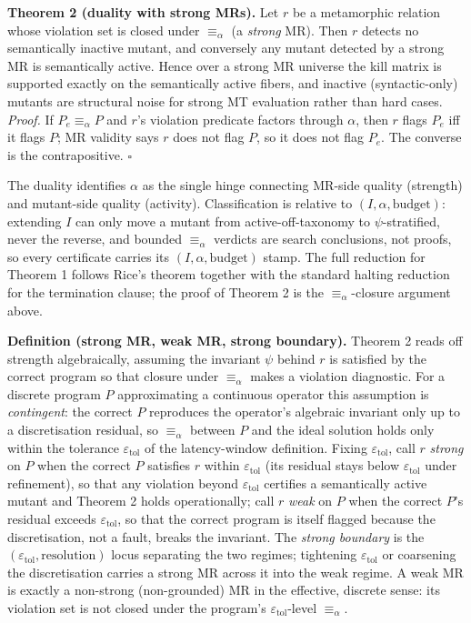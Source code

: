 \documentclass[review,12pt,authoryear]{elsarticle}
\begin{document}
\textbf{Theorem 2 (duality with strong MRs).} Let $r$ be a
metamorphic relation whose violation set is closed under $\equiv_\alpha$
(a \emph{strong} MR). Then $r$ detects no semantically inactive
mutant, and conversely any mutant detected by a strong MR is
semantically active. Hence over a strong MR universe the kill matrix
is supported exactly on the semantically active fibers, and inactive
(syntactic-only) mutants are structural noise for strong MT evaluation
rather than hard cases. \emph{Proof.} If $P_e \equiv_\alpha P$ and $r$'s
violation predicate factors through $\alpha$, then $r$ flags $P_e$ iff
it flags $P$; MR validity says $r$ does not flag $P$, so it does not
flag $P_e$. The converse is the contrapositive. $\square$

The duality identifies $\alpha$ as the single hinge connecting MR-side
quality (strength) and mutant-side quality (activity). Classification
is relative to $(I, \alpha, \text{budget})$: extending $I$ can only move
a mutant from active-off-taxonomy to $\psi$-stratified, never the
reverse, and bounded $\equiv_\alpha$ verdicts are search conclusions,
not proofs, so every certificate carries its $(I, \alpha, \text{budget})$
stamp. The full reduction for Theorem 1 follows Rice's theorem together
with the standard halting reduction for the termination clause; the
proof of Theorem 2 is the $\equiv_\alpha$-closure argument above.

\textbf{Definition (strong MR, weak MR, strong boundary).} Theorem 2
reads off strength algebraically, assuming the invariant $\psi$ behind
$r$ is satisfied by the correct program so that closure under
$\equiv_\alpha$ makes a violation diagnostic. For a discrete program $P$
approximating a continuous operator this assumption is \emph{contingent}:
the correct $P$ reproduces the operator's algebraic invariant only up to
a discretisation residual, so $\equiv_\alpha$ between $P$ and the ideal
solution holds only within the tolerance $\varepsilon_{\mathrm{tol}}$ of
the latency-window definition. Fixing $\varepsilon_{\mathrm{tol}}$, call
$r$ \emph{strong} on $P$ when the correct $P$ satisfies $r$ within
$\varepsilon_{\mathrm{tol}}$ (its residual stays below
$\varepsilon_{\mathrm{tol}}$ under refinement), so that any violation
beyond $\varepsilon_{\mathrm{tol}}$ certifies a semantically active
mutant and Theorem 2 holds operationally; call $r$ \emph{weak} on $P$
when the correct $P$'s residual exceeds $\varepsilon_{\mathrm{tol}}$, so
that the correct program is itself flagged because the discretisation,
not a fault, breaks the invariant. The \emph{strong boundary} is the
$(\varepsilon_{\mathrm{tol}}, \text{resolution})$ locus separating the
two regimes; tightening $\varepsilon_{\mathrm{tol}}$ or coarsening the
discretisation carries a strong MR across it into the weak regime. A weak
MR is exactly a non-strong (non-grounded) MR in the effective, discrete
sense: its violation set is not closed under the program's
$\varepsilon_{\mathrm{tol}}$-level $\equiv_\alpha$.
\end{document}
